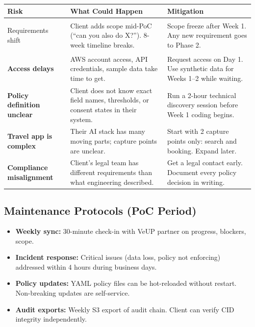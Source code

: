 \documentclass[11pt, a4paper]{article}
\begin{document}
\begin{longtable}{>{\bfseries}p{3.5cm} p{5cm} p{5cm}}
\toprule
\textbf{Risk} & \textbf{What Could Happen} & \textbf{Mitigation} \\
\midrule
\endhead
\bottomrule
\endfoot

Requirements shift &
Client adds scope mid-PoC (``can you also do X?''). 8-week timeline breaks. &
Scope freeze after Week 1. Any new requirement goes to Phase 2. \\[6pt]

Access delays &
AWS account access, API credentials, sample data take time to get. &
Request access on Day 1. Use synthetic data for Weeks 1--2 while waiting. \\[6pt]

Policy definition unclear &
Client does not know exact field names, thresholds, or consent states in their system. &
Run a 2-hour technical discovery session before Week 1 coding begins. \\[6pt]

Travel app is complex &
Their AI stack has many moving parts; capture points are unclear. &
Start with 2 capture points only: search and booking. Expand later. \\[6pt]

Compliance misalignment &
Client's legal team has different requirements than what engineering described. &
Get a legal contact early. Document every policy decision in writing. \\

\end{longtable}

\subsection{Maintenance Protocols (PoC Period)}

\begin{itemize}
  \item \textbf{Weekly sync:} 30-minute check-in with VeUP partner on progress, blockers, scope.
  \item \textbf{Incident response:} Critical issues (data loss, policy not enforcing) addressed within 4 hours during business days.
  \item \textbf{Policy updates:} YAML policy files can be hot-reloaded without restart. Non-breaking updates are self-service.
  \item \textbf{Audit exports:} Weekly S3 export of audit chain. Client can verify CID integrity independently.
\end{itemize}
\end{document}
